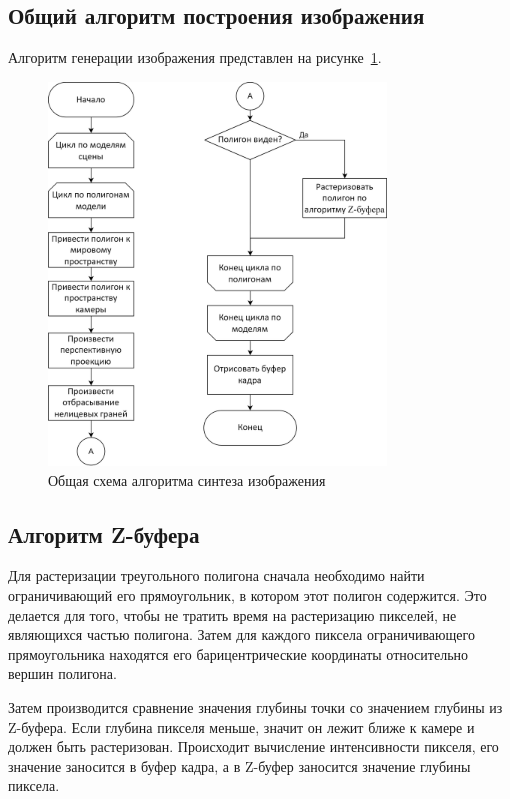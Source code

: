 \subsection{Общий алгоритм построения изображения}

Алгоритм генерации изображения представлен на рисунке~\ref{fig:alg_scene}.

\begin{figure}[h]
	\centering
	\includegraphics[width=0.8\textwidth]{img/algorithms/alg_scene.png}
	\caption{Общая схема алгоритма синтеза изображения}
	\label{fig:alg_scene}
\end{figure}

\clearpage

\subsection{Алгоритм Z-буфера}

Для растеризации треугольного полигона сначала необходимо найти ограничивающий его прямоугольник, в котором этот полигон содержится. 
Это делается для того, чтобы не тратить время на растеризацию пикселей, не являющихся частью полигона.
Затем для каждого пиксела ограничивающего прямоугольника находятся его барицентрические координаты относительно вершин полигона.

Затем производится сравнение значения глубины точки со значением глубины из Z-буфера. Если глубина пикселя меньше, значит он лежит ближе к камере и должен быть растеризован. Происходит вычисление интенсивности пикселя, его значение заносится в буфер кадра, а в Z-буфер заносится значение глубины пиксела.

